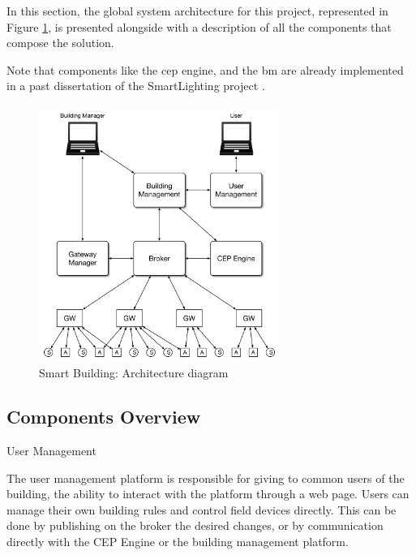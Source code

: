 In this section, the global system architecture for this project, represented in Figure \ref{fig:arch}, is presented alongside with a description of all the components that compose the solution.

Note that components like the \ac{cep} engine, and the \ac{bm} are already implemented in a past dissertation of the SmartLighting project \cite{helder}.

\begin{figure}[H]
	\centering
	\includegraphics[width=0.7\textwidth]{figures/architecture.png}
	\caption{Smart Building: Architecture diagram}
	\label{fig:arch}
\end{figure}



\subsection{Components Overview}

\begin{Paragraph}{User Management}
	
	The user management platform is responsible for giving to common users of the building, the ability to interact with the platform through a web page. Users can manage their own building rules and control field devices directly. This can be done by publishing on the broker the desired changes, or by communication directly with the CEP Engine or the building management platform.
	
\end{Paragraph}

